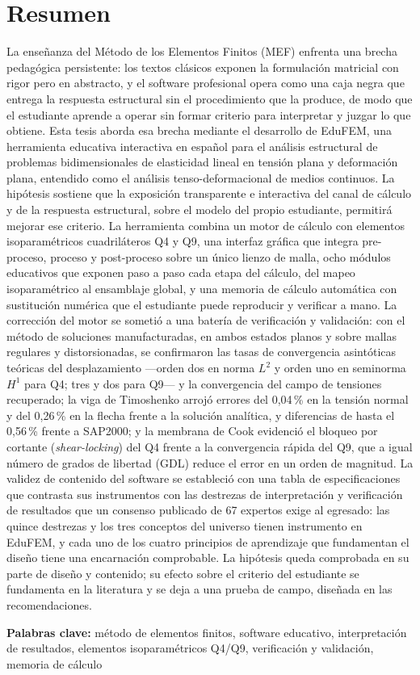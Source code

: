 \chapter*{Resumen}

La enseñanza del Método de los Elementos Finitos (MEF) enfrenta una brecha pedagógica persistente: los textos clásicos exponen la formulación matricial con rigor pero en abstracto, y el software profesional opera como una caja negra que entrega la respuesta estructural sin el procedimiento que la produce, de modo que el estudiante aprende a operar sin formar criterio para interpretar y juzgar lo que obtiene. Esta tesis aborda esa brecha mediante el desarrollo de EduFEM, una herramienta educativa interactiva en español para el análisis estructural de problemas bidimensionales de elasticidad lineal en tensión plana y deformación plana, entendido como el análisis tenso-deformacional de medios continuos. La hipótesis sostiene que la exposición transparente e interactiva del canal de cálculo y de la respuesta estructural, sobre el modelo del propio estudiante, permitirá mejorar ese criterio. La herramienta combina un motor de cálculo con elementos isoparamétricos cuadriláteros Q4 y Q9, una interfaz gráfica que integra pre-proceso, proceso y post-proceso sobre un único lienzo de malla, ocho módulos educativos que exponen paso a paso cada etapa del cálculo, del mapeo isoparamétrico al ensamblaje global, y una memoria de cálculo automática con sustitución numérica que el estudiante puede reproducir y verificar a mano. La corrección del motor se sometió a una batería de verificación y validación: con el método de soluciones manufacturadas, en ambos estados planos y sobre mallas regulares y distorsionadas, se confirmaron las tasas de convergencia asintóticas teóricas del desplazamiento —orden dos en norma $L^2$ y orden uno en seminorma $H^1$ para Q4; tres y dos para Q9— y la convergencia del campo de tensiones recuperado; la viga de Timoshenko arrojó errores del 0,04\,\% en la tensión normal y del 0,26\,\% en la flecha frente a la solución analítica, y diferencias de hasta el 0,56\,\% frente a SAP2000; y la membrana de Cook evidenció el bloqueo por cortante (\emph{shear-locking}) del Q4 frente a la convergencia rápida del Q9, que a igual número de grados de libertad (GDL) reduce el error en un orden de magnitud. La validez de contenido del software se estableció con una tabla de especificaciones que contrasta sus instrumentos con las destrezas de interpretación y verificación de resultados que un consenso publicado de 67 expertos exige al egresado: las quince destrezas y los tres conceptos del universo tienen instrumento en EduFEM, y cada uno de los cuatro principios de aprendizaje que fundamentan el diseño tiene una encarnación comprobable. La hipótesis queda comprobada en su parte de diseño y contenido; su efecto sobre el criterio del estudiante se fundamenta en la literatura y se deja a una prueba de campo, diseñada en las recomendaciones.

\noindent\textbf{Palabras clave:} método de elementos finitos, software educativo, interpretación de resultados, elementos isoparamétricos Q4/Q9, verificación y validación, memoria de cálculo
